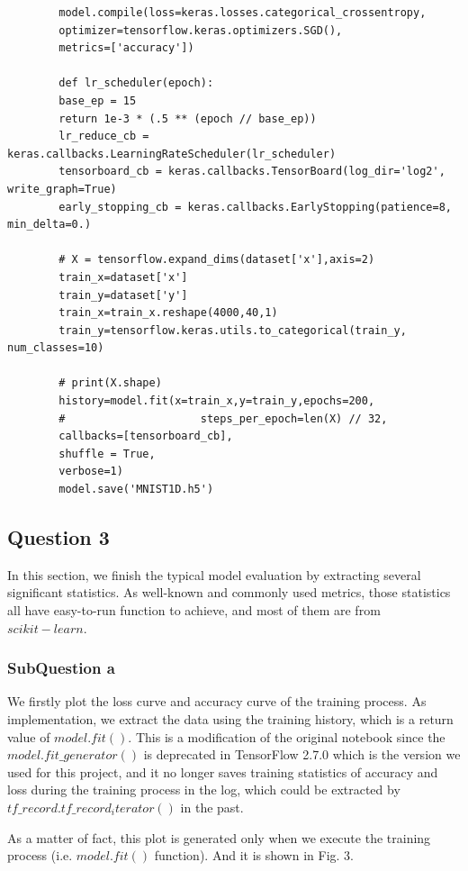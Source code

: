 \documentclass[conference]{IEEEtran}
\begin{document}
	\begin{lstlisting}
		model.compile(loss=keras.losses.categorical_crossentropy,
		optimizer=tensorflow.keras.optimizers.SGD(),
		metrics=['accuracy'])
		
		def lr_scheduler(epoch):
		base_ep = 15
		return 1e-3 * (.5 ** (epoch // base_ep))
		lr_reduce_cb = keras.callbacks.LearningRateScheduler(lr_scheduler)
		tensorboard_cb = keras.callbacks.TensorBoard(log_dir='log2', write_graph=True)
		early_stopping_cb = keras.callbacks.EarlyStopping(patience=8, min_delta=0.)
		
		# X = tensorflow.expand_dims(dataset['x'],axis=2)
		train_x=dataset['x']
		train_y=dataset['y']
		train_x=train_x.reshape(4000,40,1)
		train_y=tensorflow.keras.utils.to_categorical(train_y, num_classes=10)
		
		# print(X.shape)
		history=model.fit(x=train_x,y=train_y,epochs=200,
		#                     steps_per_epoch=len(X) // 32,
		callbacks=[tensorboard_cb],                  
		shuffle = True,
		verbose=1)
		model.save('MNIST1D.h5')
	\end{lstlisting}
	
	
	
	
	\subsection{Question 3}
	
	In this section, we finish the typical model evaluation by extracting several significant statistics. As well-known and commonly used metrics, those statistics all have easy-to-run function to achieve, and most of them are from $scikit-learn$.
	
	\subsubsection{SubQuestion a}
	
	We firstly plot the loss curve and accuracy curve of the training process. As implementation, we extract the data using the training history, which is a return value of $model.fit()$. This is a modification of the original notebook since the $model.fit\_generator()$ is deprecated in TensorFlow 2.7.0 which is the version we used for this project, and it no longer saves training statistics of accuracy and loss during the training process in the log, which could be extracted by $tf\_record.tf\_record_iterator()$ in the past.\par
	As a matter of fact, this plot is generated only when we execute the training process (i.e. $model.fit()$ function). And it is shown in Fig. 3.
	
\end{document}
